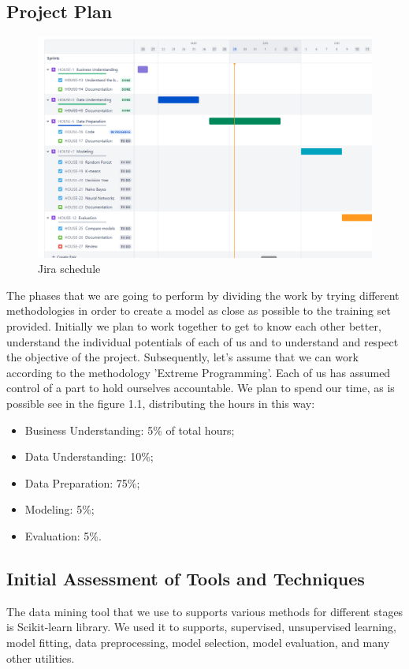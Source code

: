 \subsection{Project Plan}

\begin{figure}[t]
    \includegraphics[scale=0.45]{imgs/jira_schedule.png}
    \centering
    \caption{Jira schedule}
    \hrulefill\vspace{15pt}\par
\end{figure}

The phases that we are going to perform by dividing the work by trying different methodologies in order to create a model as close as possible to the training set provided. Initially we plan to work together to get to know each other better, understand the individual potentials of each of us and to understand and respect the objective of the project. Subsequently, let's assume that we can work according to the methodology 'Extreme Programming'. Each of us has assumed control of a part to hold ourselves accountable.
We plan to spend our time, as is possible see in the figure 1.1, distributing the hours in this way:
\begin{itemize}
\item Business Understanding: 5\% of total hours;
\item Data Understanding: 10\%;
\item Data Preparation: 75\%; 
\item Modeling: 5\%;
\item Evaluation: 5\%.
\end{itemize}

\subsection{Initial Assessment of Tools and
Techniques}
The data mining tool that we use to supports various methods for different stages is Scikit-learn library. We used it to supports, supervised, unsupervised learning, model fitting, data preprocessing, model selection, model evaluation, and many other utilities.